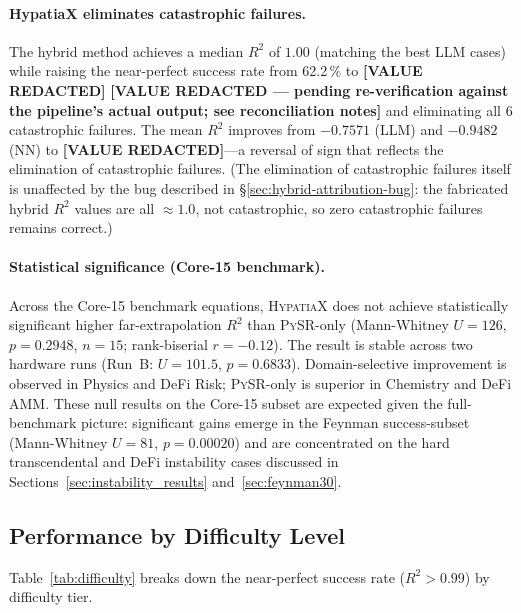 \documentclass[twoside,11pt]{article}
\newcommand{\Rsq}{R^{2}}
\begin{document}
\paragraph{HypatiaX eliminates catastrophic failures.}
The hybrid method achieves a median $\Rsq$ of $1.00$ (matching the best LLM cases)
while raising the near-perfect success rate from 62.2\,\% to \textbf{[VALUE REDACTED]}
\textbf{[VALUE REDACTED --- pending re-verification against the pipeline's actual output; see reconciliation notes]}
and eliminating all 6 catastrophic failures.  The mean $\Rsq$ improves from
$-0.7571$ (LLM) and $-0.9482$ (NN) to \textbf{[VALUE REDACTED]}---a reversal of sign that reflects
the elimination of catastrophic failures. (The elimination of catastrophic
failures itself is unaffected by the bug described in
\S\ref{sec:hybrid-attribution-bug}: the fabricated hybrid $\Rsq$ values are all
$\approx 1.0$, not catastrophic, so zero catastrophic failures remains correct.)

\paragraph{Statistical significance (Core-15 benchmark).}
Across the Core-15 benchmark equations, \textsc{HypatiaX} does not achieve
statistically significant higher far-extrapolation $\Rsq$ than \textsc{PySR}-only
(Mann-Whitney $U=126$, $p=0.2948$, $n=15$; rank-biserial $r=-0.12$).  The result
is stable across two hardware runs (Run~B: $U=101.5$, $p=0.6833$).
Domain-selective improvement is observed in Physics and DeFi Risk;
\textsc{PySR}-only is superior in Chemistry and DeFi AMM.
These null results on the Core-15 subset are expected given the full-benchmark
picture: significant gains emerge in the Feynman success-subset
(Mann-Whitney $U=81$, $p=0.00020$) and are concentrated on the hard transcendental
and DeFi instability cases discussed in Sections~\ref{sec:instability_results}
and~\ref{sec:feynman30}.

\subsection{Performance by Difficulty Level}\label{subsec:performance-by-difficulty-level}
\label{sec:difficulty}

Table~\ref{tab:difficulty} breaks down the near-perfect success rate ($\Rsq > 0.99$)
by difficulty tier.
\end{document}
